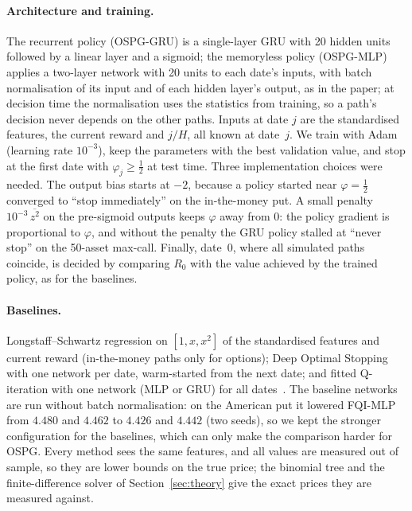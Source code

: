 \paragraph{Architecture and training.}
The recurrent policy (OSPG-GRU) is a single-layer GRU with 20 hidden units followed by a
linear layer and a sigmoid; the memoryless policy (OSPG-MLP) applies a two-layer
network with 20 units to each date's inputs, with batch normalisation of its input and of
each hidden layer's output, as in the paper; at decision time the normalisation uses the
statistics from training, so a path's decision never depends on the other paths. Inputs at date $j$ are the standardised
features, the current reward and $j/H$, all known at date~$j$. We train with Adam
(learning rate $10^{-3}$), keep the parameters with the best validation value, and stop
at the first date with $\varphi_j\ge\frac12$ at test time. Three implementation choices
were needed. The output bias starts at $-2$, because a policy started near
$\varphi=\frac12$ converged to ``stop immediately'' on the in-the-money put. A small
penalty $10^{-3}\,\overline{z^2}$ on the pre-sigmoid outputs keeps $\varphi$ away from $0$:
the policy gradient is proportional to $\varphi$, and without the penalty the GRU policy
stalled at ``never stop'' on the 50-asset max-call. Finally, date~$0$, where all simulated
paths coincide, is decided by comparing $R_0$ with the value achieved by the trained
policy, as for the baselines.

\paragraph{Baselines.}
Longstaff--Schwartz regression on $[1,x,x^2]$ of the standardised features and current
reward (in-the-money paths only for options); Deep Optimal Stopping with one network per
date, warm-started from the next date; and fitted Q-iteration with one network (MLP or
GRU) for all dates~\cite{ospg2023}. The baseline networks are run without batch
normalisation: on the American put it lowered FQI-MLP from $4.480$ and $4.462$ to $4.426$
and $4.442$ (two seeds), so we kept the stronger configuration for the baselines, which
can only make the comparison harder for OSPG. Every method sees the same features, and
all values are measured out of sample, so they are lower bounds on the true price; the
binomial tree and the finite-difference solver of Section~\ref{sec:theory} give the exact prices they
are measured against.
